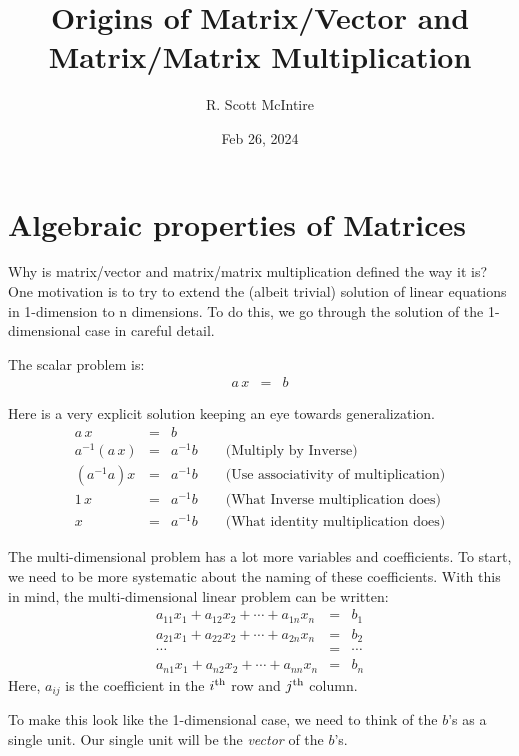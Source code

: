 \documentclass{article}
\title{Origins of Matrix/Vector and Matrix/Matrix Multiplication}
\author{R. Scott McIntire}
\date{Feb 26, 2024}
\begin{document}
\maketitle


\section{Algebraic properties of Matrices}
Why is matrix/vector and matrix/matrix multiplication defined the way it is?
One motivation is to try to extend the (albeit trivial) solution of linear
equations in 1-dimension to n dimensions. To do this, we go through the solution
of the 1-dimensional case in careful detail.

The scalar problem is:
\begin{eqnarray}
  a \, x & = & b \label{scalar-problem}
\end{eqnarray}

Here is a very explicit solution keeping an eye towards generalization.
\begin{eqnarray}
  a \, x & = & b \\
  a^{-1} ( a \, x ) & = & a^{-1} b \quad \quad \text{(Multiply by Inverse)} \label{inv} \\
  (a^{-1} a) x & = & a^{-1} b \quad \quad \text{(Use associativity of multiplication)} \label{assoc} \\
  1 \, x & = & a^{-1} b \quad \quad \text{(What Inverse multiplication does)} \label{inv-mult} \\
  x & = & a^{-1} b \quad \quad \text{(What identity multiplication does)} \label{identity}
\end{eqnarray}

The multi-dimensional problem has a lot more variables and coefficients.
To start, we need to be more systematic about the naming of these coefficients.
With this in mind, the multi-dimensional linear problem can be written:
\begin{eqnarray*}
  a_{11} x_1 + a_{12} x_2 + \cdots + a_{1n} x_n & = & b_1 \\
  a_{21} x_1 + a_{22} x_2 + \cdots + a_{2n} x_n & = & b_2 \\
  \cdots & = & \cdots \\
  a_{n1} x_1 + a_{n2} x_2 + \cdots + a_{nn} x_n & = & b_n 
\end{eqnarray*}
Here, $a_{ij}$ is the coefficient in the $i^{\rm th}$ row and $j^{\rm th}$ column.


To make this look like the 1-dimensional case, we need to think of the $b$'s as
a single unit. Our single unit will be the {\em vector\/} of the $b$'s.
\end{document}
